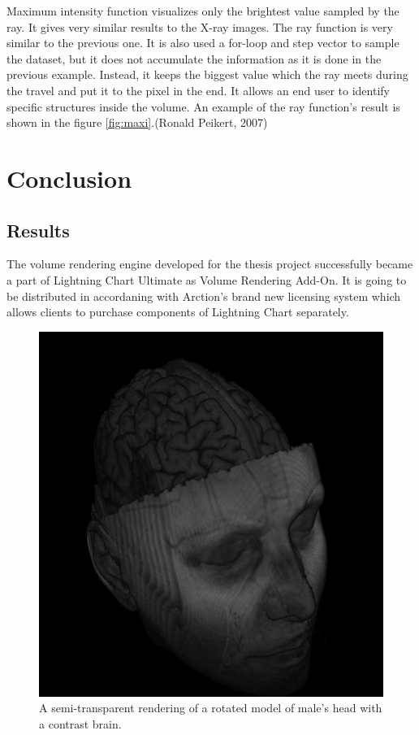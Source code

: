 \documentclass[twoside, english, 11pt]{report}
\begin{document}
Maximum intensity function visualizes only the brightest value sampled by the ray. It gives very similar results to the X-ray images. The ray function is very similar to the previous one. It is also used a for-loop and step vector to sample the dataset, but it does not accumulate the information as it is done in the previous example. Instead, it keeps the biggest value which the ray meets during the travel and put it to the pixel in the end. It allows an end user to identify specific structures inside the volume. An example of the ray function's result is shown in the figure \ref{fig:maxi}.(Ronald Peikert, 2007)

\chapter{Conclusion}
\section{Results}
The volume rendering engine developed for the thesis project successfully became a part of Lightning Chart Ultimate as Volume Rendering Add-On. It is going to be distributed in accordaning with Arction's brand new licensing system which allows clients to purchase components of Lightning Chart separately.\\

\begin{figure}[H]
\centerline{\includegraphics[scale = 0.6]{img/brain}}
\caption{A semi-transparent rendering of a rotated model of male's head with a contrast brain.\label{fig:brain}}
\end{figure}
\end{document}
